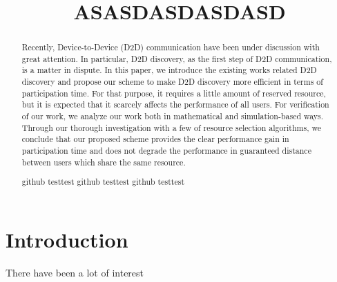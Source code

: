 \documentclass[conference]{IEEEtran}
\begin{document}
%
\title{ASASDASDASDASD}


\author{
}


\maketitle


\begin{abstract}
Recently, Device-to-Device (D2D) communication have been under discussion with great attention. In particular, D2D discovery, as the first step of D2D communication, is a matter in dispute. In this paper, we introduce the existing works related D2D discovery and propose our scheme to make D2D discovery more efficient in terms of participation time. For that purpose, it requires a little amount of reserved resource, but it is expected that it scarcely affects the performance of all users.
For verification of our work, we analyze our work both in mathematical and simulation-based ways. Through our thorough investigation with a few of resource selection algorithms, we conclude that our proposed scheme provides the clear performance gain in participation time and does not degrade the performance in guaranteed distance between users which share the same resource.

github testtest
github testtest
github testtest

\end{abstract}



\IEEEpeerreviewmaketitle



\section{Introduction}
There have been a lot of interest 
\end{document}
